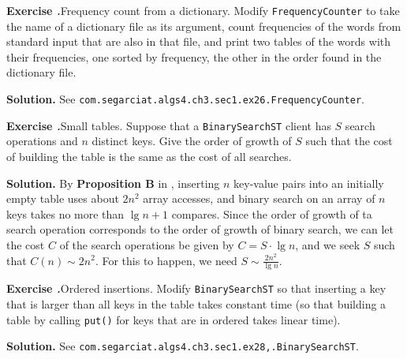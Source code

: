 \documentclass[12pt, a4paper]{article}
\newenvironment{ex}[2][Exercise]
{\par\medskip\noindent \textbf{#1 #2.}}
{\medskip}
\newenvironment{sol}[1][Solution]
{\par\medskip\noindent \textbf{#1.} }
{\medskip}
\begin{document}
	\begin{ex}{26}
		\emph{Frequency count from a dictionary}. Modify \texttt{FrequencyCounter} to take
		the name of a dictionary file as its argument, count frequencies of the words from
		standard input that are also in that file, and print two tables of the words with
		their frequencies, one sorted by frequency, the other in the order found in the
		dictionary file.
	\end{ex}
	\begin{sol}
		See \texttt{com.segarciat.algs4.ch3.sec1.ex26.FrequencyCounter}.
	\end{sol}
	\begin{ex}{27}
		\emph{Small tables}. Suppose that a \texttt{BinarySearchST} client has $S$ search
		operations and $n$ distinct keys. Give the order of growth of $S$ such that the cost
		of building the table is the same as the cost of all searches.
	\end{ex}
	\begin{sol}
		By \textbf{Proposition B} in \cite{sedgewick_wayne}, inserting $n$ key-value pairs
		into an initially empty table uses about $2n^2$ array accesses, and binary search
		on an array of $n$ keys takes no more than $\lg n + 1$ compares. Since the order
		of growth of ta search operation corresponds to the order of growth of binary search,
		we can let the cost $C$ of the search operations be given by $C=S\cdot \lg n$,
		and we seek $S$ such that $C(n)\sim 2n^2$. For this to happen, we need
		$S\sim \frac{2n^2}{\lg n}$.
	\end{sol}
	\begin{ex}{28}
		\emph{Ordered insertions}. Modify \texttt{BinarySearchST} so that inserting a key that
		is larger than all keys in the table takes constant time (so that building a table by
		calling \texttt{put()} for keys that are in ordered takes linear time).
	\end{ex}
	\begin{sol}
		See \texttt{com.segarciat.algs4.ch3.sec1.ex28,.BinarySearchST}.
	\end{sol}
	\pagebreak
	\printbibliography
\end{document}
